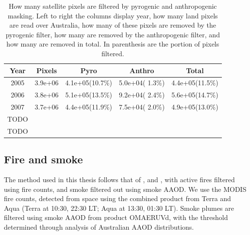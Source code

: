  \begin{table}
    \caption{How many satellite pixels are filtered by pyrogenic and anthropogenic masking. Left to right the columns display year, how many land pixels are read over Australia, how many of these pixels are removed by the pyrogenic filter, how many are removed by the anthropogenic filter, and how many are removed in total. In parenthesis are the portion of pixels filtered.}
    \begin{tabular}{ c c c c c }
      \textbf{Year} & \textbf{Pixels} & \textbf{Pyro} & \textbf{Anthro} & \textbf{Total} 
      \\ \hline
      2005   &  3.9e+06    &  4.1e+05(10.7\%)     &    5.0e+04( 1.3\%)    &    4.4e+05(11.5\%) \\
      2006   &  3.8e+06    &  5.1e+05(13.5\%)     &    9.2e+04( 2.4\%)    &    5.6e+05(14.7\%) \\
      2007   &  3.7e+06    &  4.4e+05(11.9\%)     &    7.5e+04( 2.0\%)    &    4.9e+05(13.0\%) \\
      TODO &  &  &  \\
      TODO &  &  &  \\
    \end{tabular}
    \label{Model:filter:tab_summary_pixels_masked}
  \end{table}
  
  
  
  \subsection{Fire and smoke}
    \label{Model:filter:fire}
    
    
    The method used in this thesis follows that of \textcite{Marais2012}, and \textcite{Barkley2013}, with active fires filtered using fire counts, and smoke filtered out using smoke AAOD.
    We use the MODIS fire counts, detected from space using the combined product from Terra and Aqua (Terra at 10:30, 22:30 LT; Aqua at 13:30, 01:30 LT).
    Smoke plumes are filtered using smoke AAOD from product OMAERUVd, with the threshold determined through analysis of Australian AAOD distributions.
    
